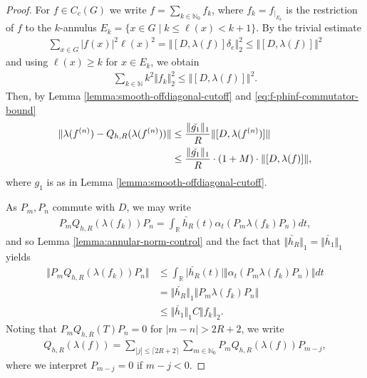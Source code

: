\documentclass[12pt,a4paper,oneside,final,reqno]{amsart}
\newcommand{\N}{\mathbb{N}}
\newcommand{\R}{\mathbb{R}}
\theoremstyle{plain}
\theoremstyle{definition}
\begin{document}
\begin{proof}
    
   For $f \in C_c(G)$ we write $f = \sum_{k \in \N_0} f_k$, where $f_k = f_{\vert_{E_k}}$ is the restriction of $f$ to the $k$-annulus $E_k = \{x \in G \mid k \leq \ell(x) < k+1 \}$. By the trivial estimate
   \begin{align*}
       \sum_{x \in G} |f(x)|^2 \ell(x)^2 = \Vert [D,\lambda(f) ] \delta_e \Vert_2^2 \leq \Vert [D,\lambda(f)] \Vert ^2
   \end{align*}
   and using $\ell(x) \geq k$ for $x \in E_k$, we obtain
   \begin{align}\label{eq:lower-annulus-L-bound}
       \sum_{k \in \N} k^2 \Vert f_k\Vert_2^2 \leq \Vert [D,\lambda(f)]\Vert^2. 
   \end{align}
   Then, by Lemma \ref{lemma:smooth-offdiagonal-cutoff} and \eqref{eq:f-phinf-commutator-bound}
   \begin{align*}
       \Vert \lambda(f^{(n)})-Q_{h,R}(\lambda(f^{(n)}))\Vert &\leq \frac{\Vert\check{g_1}\Vert_1}{R} \Vert [D, \lambda(f^{(n)}) ]\Vert \notag \\
       &\leq \frac{\Vert\check{g_1}\Vert_1}{R} \cdot (1+M)\cdot  \Vert [D, \lambda(f)] \Vert,
   \end{align*}
   where $g_1$ is as in Lemma \ref{lemma:smooth-offdiagonal-cutoff}. 

   As $P_m, P_n$ commute with $D$, we may write
   \begin{align*}
       P_m Q_{h,R}(\lambda(f_k))P_n = \int_\R \check{h_R}(t) \alpha_t (P_m \lambda(f_k) P_n) dt,
   \end{align*}
   and so Lemma \ref{lemma:annular-norm-control} and the fact that $\Vert \check{h_R} \Vert_1 = \Vert \check{h_1}\Vert_1$ yields
   \begin{align*}
       \Vert P_m Q_{h,R}(\lambda(f_k))P_n \Vert &\leq \int_\R \vert \check{h_R}(t) \vert \Vert \alpha_t(P_m \lambda(f_k) P_n)\Vert dt \\
       &= \Vert \check{h_R} \Vert_1 \Vert P_m \lambda(f_k) P_n \Vert \\
       &\leq \Vert \check{h_1} \Vert_1 C \Vert f_k\Vert_2.
   \end{align*}
    Noting that $P_mQ_{h,R}(T)P_n=0$ for $|m-n| > 2R+2$, we write 
    \begin{align*}
        Q_{h,R}(\lambda(f)) = \sum_{|j|\leq \lceil 2R +2 \rceil} \sum_{m \in \N_0} P_m Q_{h,R}(\lambda(f)) P_{m-j},
    \end{align*}
    where we interpret $P_{m-j} = 0$ if $m-j < 0$. 
    

\end{proof}
\end{document}

